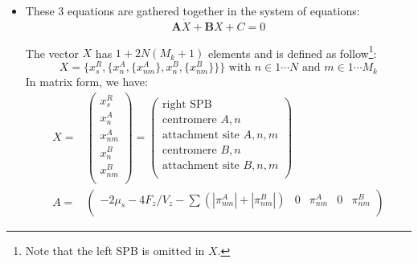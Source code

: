 \documentclass[a4paper,12pt]{article}
\begin{document}
\begin{itemize}
\item These 3 equations are gathered together in the system of equations:
$$
\mathbf{A}\dot{X} + \mathbf{B}X + C = 0
$$

The vector $X$ has $1 + 2N(M_k + 1)$ elements and is defined as
follow\footnote{Note that the left SPB is omitted in $X$.}:
\begin{equation*}
  X = \{x_s^R, \{x_n^A, \{x_{nm}^A\},  x_n^B,%
  \{x_{nm}^B \}\}\}\mbox{ with } n \in 1 \cdots N %
  \mbox{ and } m \in 1 \cdots M_k
\end{equation*}
In matrix form, we have:\\
\begin{equation}
  \begin{aligned}
    X = &%
    \begin{pmatrix}
      x_s^R\\
      x_n^A\\
      x_{nm}^A\\
      x_n^B\\
      x_{nm}^B\\
    \end{pmatrix} =%
    \begin{pmatrix}
      \text{right SPB}\\
      \text{centromere }A, n\\
      \text{attachment site }A, n,m\\
      \text{centromere }B, n\\
      \text{attachment site }B, n,m\\
    \end{pmatrix}\\
    A = &%
    \begin{pmatrix}
      - 2 \mu_s - 4 F_z/V_z - \sum (|\pi_{nm}^A| + |\pi_{nm}^B|)& 0 & \pi_{nm}^A &%
      0 &  \pi_{nm}^B\\



\end{pmatrix}
\end{aligned}
\end{equation}
\end{itemize}
\end{document}
